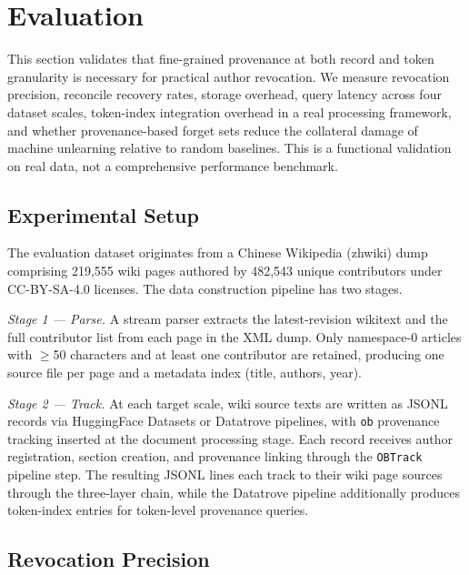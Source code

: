 \section{Evaluation}
\label{sec:evaluation}

This section validates that fine-grained provenance at both record and token granularity is necessary for practical author revocation. We measure revocation precision, reconcile recovery rates, storage overhead, query latency across four dataset scales, token-index integration overhead in a real processing framework, and whether provenance-based forget sets reduce the collateral damage of machine unlearning relative to random baselines. This is a functional validation on real data, not a comprehensive performance benchmark.

\subsection{Experimental Setup}
\label{sec:setup}

The evaluation dataset originates from a Chinese Wikipedia (zhwiki) dump comprising 219,555 wiki pages authored by 482,543 unique contributors under CC-BY-SA-4.0 licenses. The data construction pipeline has two stages.

\emph{Stage 1 --- Parse.} A stream parser extracts the latest-revision wikitext and the full contributor list from each page in the XML dump. Only namespace-0 articles with $\geq$50 characters and at least one contributor are retained, producing one source file per page and a metadata index (title, authors, year).

\emph{Stage 2 --- Track.} At each target scale, wiki source texts are written as JSONL records via HuggingFace Datasets or Datatrove pipelines, with \texttt{ob} provenance tracking inserted at the document processing stage. Each record receives author registration, section creation, and provenance linking through the \texttt{OBTrack} pipeline step. The resulting JSONL lines each track to their wiki page sources through the three-layer chain, while the Datatrove pipeline additionally produces token-index entries for token-level provenance queries.

\subsection{Revocation Precision}
\label{sec:revocation-precision}

